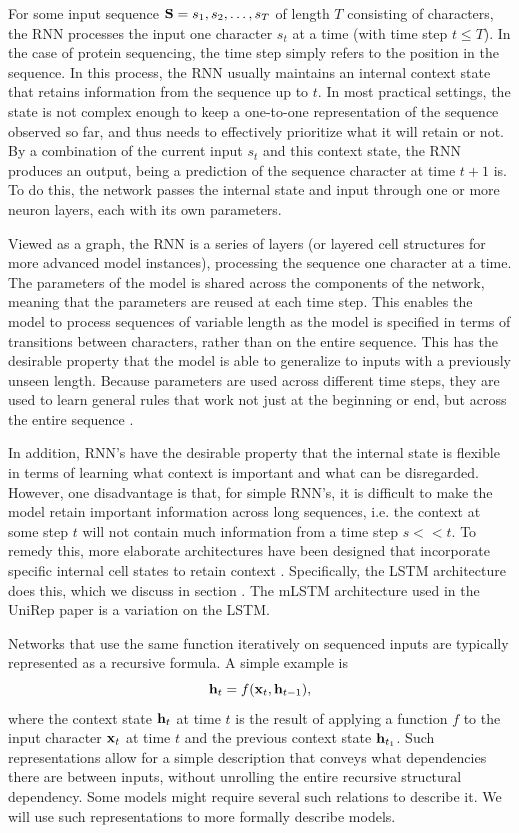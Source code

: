 \documentclass[a4paper,12pt]{article}
\begin{document}
For some input sequence $\mathbf{ S } = s_1, s_2, \ldots, s_T$ of length $T$ consisting of characters, the RNN processes the input one character $s_t$ at a time (with time step $t \leq T$). In the case of protein sequencing, the time step simply refers to the position in the sequence. In this process, the RNN usually maintains an internal context state that retains information from the sequence up to $t$. In most practical settings, the state is not complex enough to keep a one-to-one representation of the sequence observed so far, and thus needs to effectively prioritize what it will retain or not. By a combination of the current input $s_t$ and this context state, the RNN produces an output, being a prediction of the sequence character at time $t + 1$ is. To do this, the network passes the internal state and input through one or more neuron layers, each with its own parameters.

Viewed as a graph, the RNN is a series of layers (or layered cell structures for more advanced model instances), processing the sequence one character at a time. The parameters of the model is shared across the components of the network, meaning that the parameters are reused at each time step. This enables the model to process sequences of variable length as the model is specified in terms of transitions between characters, rather than on the entire sequence. This has the desirable property that the model is able to generalize to inputs with a previously unseen length. Because parameters are used across different time steps, they are used to learn general rules that work not just at the beginning or end, but across the entire sequence \cite{Goodfellow-et-al-2016}.

In addition, RNN's have the desirable property that the internal state is flexible in terms of learning what context is important and what can be disregarded. However, one disadvantage is that, for simple RNN's, it is difficult to make the model retain important information across long sequences, i.e. the context at some step $t$ will not contain much information from a time step $s << t$. To remedy this, more elaborate architectures have been designed that incorporate specific internal cell states to retain context \cite{graves2012supervised}. Specifically, the LSTM architecture does this, which we discuss in section . The mLSTM architecture used in the UniRep paper is a variation on the LSTM.

Networks that use the same function iteratively on sequenced inputs are typically represented as a recursive formula. A simple example is
\[ \mathbf{ h }_t = f{\mathopen{} \left( \mathbf{ x }_t, \mathbf{ h }_{t - 1} \right) \mathclose{}}, \]
where the context state $\mathbf{ h }_t$ at time $t$ is the result of applying a function $f$ to the input character $\mathbf{ x }_t$ at time $t$ and the previous context state $\mathbf{ h }_{t_1}$. Such representations allow for a simple description that conveys what dependencies there are between inputs, without unrolling the entire recursive structural dependency. Some models might require several such relations to describe it. We will use such representations to more formally describe models.
\end{document}
